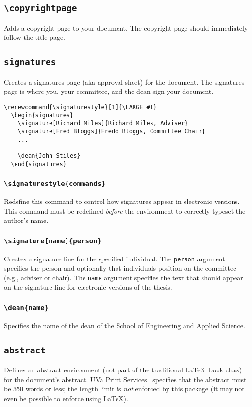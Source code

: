 \documentclass[10pt]{article}
\newcommand{\environment}[1]{\texttt{#1}}
\newcommand{\command}[1]{\texttt{\textbackslash#1}}
\newcommand{\argument}[1]{\texttt{#1}}
\begin{document}
\subsection{\command{copyrightpage}}
Adds a copyright page to your document.
The copyright page should immediately follow the title page.

\subsection{\environment{signatures}}
Creates a signatures page (aka approval sheet) for the document.
The signatures page is where you, your committee, and the dean sign your document.

\begin{lstlisting}[gobble=2]
  \renewcommand{\signaturestyle}[1]{\LARGE #1}
  \begin{signatures}
    \signature[Richard Miles]{Richard Miles, Adviser}
    \signature[Fred Bloggs]{Fredd Bloggs, Committee Chair}
    ...
    
    \dean{John Stiles}
  \end{signatures}
\end{lstlisting}

\subsubsection{\command{signaturestyle\{commands\}}}
Redefine this command to control how signatures appear in electronic versions.
This command must be redefined \emph{before} the environment to correctly typeset the author's name.

\subsubsection{\command{signature[name]\{person\}}}
Creates a signature line for the specified individual.
The \argument{person} argument specifies the person and optionally that individuals position on the committee (e.g., adviser or chair).
The \argument{name} argument specifies the text that should appear on the signature line for electronic versions of the thesis.

\subsubsection{\command{dean\{name\}}}
Specifies the name of the dean of the School of Engineering and Applied Science.

\subsection{\environment{abstract}}
Defines an abstract environment (not part of the traditional \LaTeX\ book class) for the document's abstract.
\Gls{UVa} Print Services~\cite{uvaprint:thesis} specifies that the abstract must be 350 words or less;
the length limit is \emph{not} enforced by this package (it may not even be possible to enforce using \LaTeX).
\end{document}
